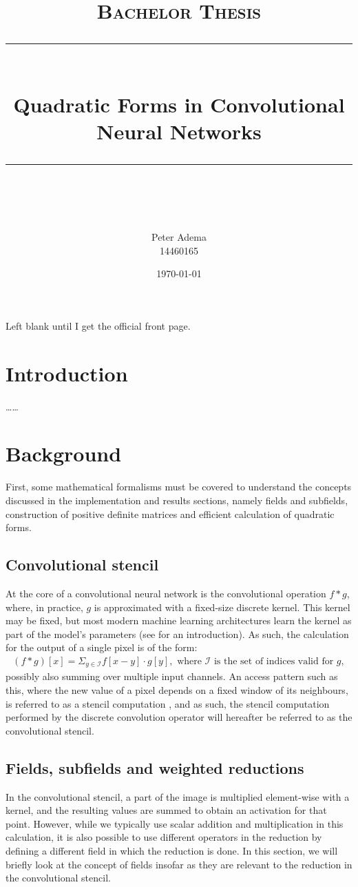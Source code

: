 \documentclass[11pt]{article} %
\title{	
    \vspace*{-1.5cm}
	\normalfont\normalsize
	\textsc{Bachelor Thesis}\\ %
	\vspace{3pt}
	\rule{\linewidth}{0.5pt}\\
	\vspace{14pt}
	{\huge Quadratic Forms in Convolutional Neural Networks}\\ %
	\vspace{4pt}
	\rule{\linewidth}{2pt}\\
	\vspace{4pt}
}
\author{
    \Large Peter Adema \\ 14460165
}
\date{\normalsize\today}  %
\def\comment#1{\color{red}#1\color{black}}
\begin{document}
\maketitle %

\comment{Left blank until I get the official front page.}
\newpage

\section{Introduction}
\comment{\ldots\ldots}
\section{Background}
First, some mathematical formalisms must be covered to understand the concepts discussed in the implementation and results sections, namely fields and subfields, construction of positive definite matrices and efficient calculation of quadratic forms.

\subsection{Convolutional stencil}
At the core of a convolutional neural network is the convolutional operation $f*g$, where, in practice, $g$ is approximated with a fixed-size discrete kernel. This kernel may be fixed, but most modern machine learning architectures learn the kernel as part of the model's parameters (see  for an introduction). As such, the calculation for the output of a single pixel is of the form:
\begin{align*}
(f*g)[x] = \Sigma_{y\in\mathcal{I}} f[x-y]\cdot g[y]	, \textrm{ where } \mathcal{I} \textrm{ is the set of indices valid for }g,
\end{align*}
possibly also summing over multiple input channels. An access pattern such as this, where the new value of a pixel depends on a fixed window of its neighbours, is referred to as a stencil computation \cite{fortranstencils}, and as such, the stencil computation performed by the discrete convolution operator will hereafter be referred to as the convolutional stencil.

\subsection{Fields, subfields and weighted reductions}
In the convolutional stencil, a part of the image is multiplied element-wise with a kernel, and the resulting values are summed to obtain an activation for that point. However, while we typically use scalar addition and multiplication in this calculation, it is also possible to use different operators in the reduction by defining a different field in which the reduction is done. In this section, we will briefly look at the concept of fields insofar as they are relevant to the reduction in the convolutional stencil.
\end{document}
